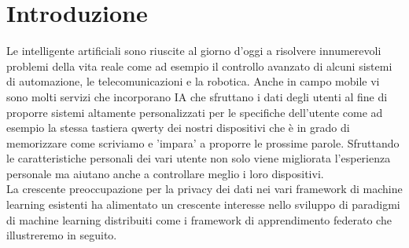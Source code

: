 \chapter{Introduzione}\label{ch:introduzione}
Le intelligente artificiali sono riuscite al giorno d'oggi a risolvere innumerevoli problemi della vita reale come ad esempio il controllo avanzato di alcuni sistemi di automazione, le telecomunicazioni e la robotica. Anche in campo mobile vi sono molti servizi che incorporano IA che sfruttano i dati degli utenti al fine di proporre sistemi altamente personalizzati per le specifiche dell'utente come ad esempio la stessa tastiera qwerty dei nostri dispositivi che è in grado di memorizzare come scriviamo e 'impara' a proporre le prossime parole. Sfruttando le caratteristiche personali dei vari utente  non solo viene migliorata l'esperienza personale ma aiutano anche a controllare meglio i loro dispositivi. \\
La crescente preoccupazione per la privacy dei dati nei vari framework di machine learning esistenti ha alimentato un crescente interesse nello sviluppo di paradigmi di machine learning distribuiti come i framework di apprendimento federato che illustreremo in seguito.
